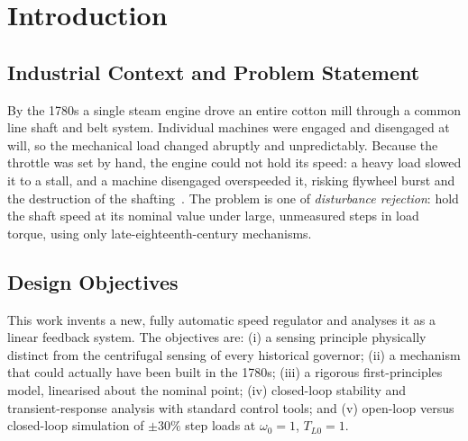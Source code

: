 \documentclass[conference]{IEEEtran}
\begin{document}
\section{Introduction}\label{sec:intro}
\subsection{Industrial Context and Problem Statement}
By the 1780s a single steam engine drove an entire cotton mill through a common line
shaft and belt system. Individual machines were engaged and disengaged at will, so
the mechanical load changed abruptly and unpredictably. Because the throttle was set
by hand, the engine could not hold its speed: a heavy load slowed it to a stall, and
a machine disengaged overspeeded it, risking flywheel burst and the destruction of
the shafting~\cite{dickinson}. The problem is one of \emph{disturbance rejection}:
hold the shaft speed at its nominal value under large, unmeasured steps in load
torque, using only late-eighteenth-century mechanisms.

\subsection{Design Objectives}
This work invents a new, fully automatic speed regulator and analyses it as a
linear feedback system. The objectives are: (i) a sensing principle physically
distinct from the centrifugal sensing of every historical governor; (ii) a mechanism
that could actually have been built in the 1780s; (iii) a rigorous first-principles
model, linearised about the nominal point; (iv) closed-loop stability and
transient-response analysis with standard control tools; and (v) open-loop versus
closed-loop simulation of $\pm30\%$ step loads at $\omega_0=1$, $T_{L0}=1$.
\end{document}
